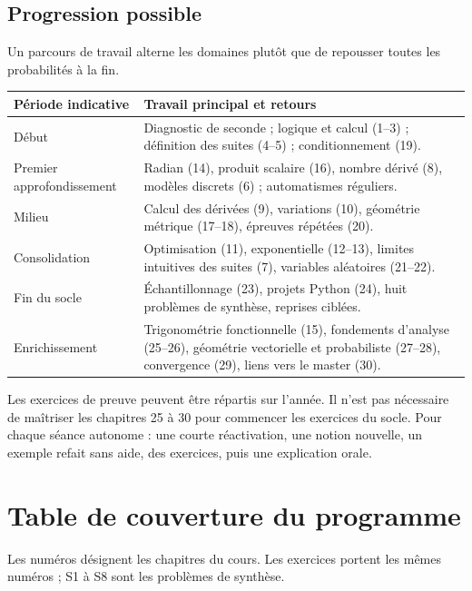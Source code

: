 \documentclass[11pt,a4paper,oneside]{book}
\begin{document}
\section{Progression possible}
Un parcours de travail alterne les domaines plutôt que de repousser toutes
les probabilités à la fin.
\begin{longtable}{>{\raggedright\arraybackslash}p{.21\linewidth}>{\raggedright\arraybackslash}p{.69\linewidth}}
\toprule Période indicative & Travail principal et retours\\\midrule
Début & Diagnostic de seconde ; logique et calcul (1--3) ; définition des suites (4--5) ; conditionnement (19).\\
Premier approfondissement & Radian (14), produit scalaire (16), nombre dérivé (8), modèles discrets (6) ; automatismes réguliers.\\
Milieu & Calcul des dérivées (9), variations (10), géométrie métrique (17--18), épreuves répétées (20).\\
Consolidation & Optimisation (11), exponentielle (12--13), limites intuitives des suites (7), variables aléatoires (21--22).\\
Fin du socle & Échantillonnage (23), projets Python (24), huit problèmes de synthèse, reprises ciblées.\\
Enrichissement & Trigonométrie fonctionnelle (15), fondements d'analyse (25--26), géométrie vectorielle et probabiliste (27--28), convergence (29), liens vers le master (30).\\\bottomrule
\end{longtable}
Les exercices de preuve peuvent être répartis sur l'année. Il n'est pas
nécessaire de maîtriser les chapitres 25 à 30 pour commencer les exercices du socle.
Pour chaque séance autonome : une courte réactivation, une notion nouvelle,
un exemple refait sans aide, des exercices, puis une explication orale.

\chapter{Table de couverture du programme}
Les numéros désignent les chapitres du cours. Les exercices portent les mêmes
numéros ; S1 à S8 sont les problèmes de synthèse.
\end{document}
